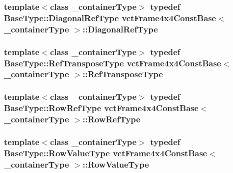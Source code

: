 \hypertarget{classvct_frame4x4_const_base_a6712c128a1d2b45ab9c713befeddf2c6}{
\subsubsection[{Diagonal\-Ref\-Type}]{\setlength{\rightskip}{0pt plus 5cm}template$<$class \-\_\-container\-Type$>$ typedef Base\-Type\-::\-Diagonal\-Ref\-Type {\bf vct\-Frame4x4\-Const\-Base}$<$ \-\_\-container\-Type $>$\-::{\bf Diagonal\-Ref\-Type}}}\label{classvct_frame4x4_const_base_a6712c128a1d2b45ab9c713befeddf2c6}
\hypertarget{classvct_frame4x4_const_base_a1cedffcdbf60e8ec01a0a61d6ceb24b7}{
\subsubsection[{Ref\-Transpose\-Type}]{\setlength{\rightskip}{0pt plus 5cm}template$<$class \-\_\-container\-Type$>$ typedef Base\-Type\-::\-Ref\-Transpose\-Type {\bf vct\-Frame4x4\-Const\-Base}$<$ \-\_\-container\-Type $>$\-::{\bf Ref\-Transpose\-Type}}}\label{classvct_frame4x4_const_base_a1cedffcdbf60e8ec01a0a61d6ceb24b7}
\hypertarget{classvct_frame4x4_const_base_a4032e45bc1de2cf3ef9436aef57f1595}{
\subsubsection[{Row\-Ref\-Type}]{\setlength{\rightskip}{0pt plus 5cm}template$<$class \-\_\-container\-Type$>$ typedef Base\-Type\-::\-Row\-Ref\-Type {\bf vct\-Frame4x4\-Const\-Base}$<$ \-\_\-container\-Type $>$\-::{\bf Row\-Ref\-Type}}}\label{classvct_frame4x4_const_base_a4032e45bc1de2cf3ef9436aef57f1595}
\hypertarget{classvct_frame4x4_const_base_aa63c7449b3c8248ec0d2e852d2389ae9}{
\subsubsection[{Row\-Value\-Type}]{\setlength{\rightskip}{0pt plus 5cm}template$<$class \-\_\-container\-Type$>$ typedef Base\-Type\-::\-Row\-Value\-Type {\bf vct\-Frame4x4\-Const\-Base}$<$ \-\_\-container\-Type $>$\-::{\bf Row\-Value\-Type}}}\label{classvct_frame4x4_const_base_aa63c7449b3c8248ec0d2e852d2389ae9}
